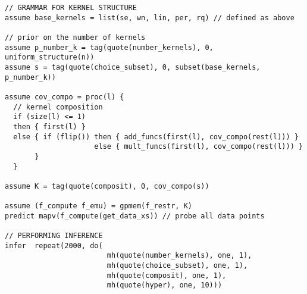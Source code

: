 \begin{minipage}{\linewidth}
\small
\belowcaptionskip=-10pt
\begin{lstlisting}[frame=single,mathescape,label=alg:structureVent,basicstyle=\selectfont\ttfamily,numbers=none]
// GRAMMAR FOR KERNEL STRUCTURE
assume base_kernels = list(se, wn, lin, per, rq) // defined as above

// prior on the number of kernels
assume p_number_k = tag(quote(number_kernels), 0, uniform_structure(n))
assume s = tag(quote(choice_subset), 0, subset(base_kernels, p_number_k))

assume cov_compo = proc(l) {
  // kernel composition
  if (size(l) <= 1)
  then { first(l) }
  else { if (flip()) then { add_funcs(first(l), cov_compo(rest(l))) }
                     else { mult_funcs(first(l), cov_compo(rest(l))) }
       }
  }
                          
assume K = tag(quote(composit), 0, cov_compo(s))

assume (f_compute f_emu) = gpmem(f_restr, K)
predict mapv(f_compute(get_data_xs)) // probe all data points

// PERFORMING INFERENCE  
infer  repeat(2000, do(
                        mh(quote(number_kernels), one, 1),
                        mh(quote(choice_subset), one, 1),
                        mh(quote(composit), one, 1),
                        mh(quote(hyper), one, 10)))
\end{lstlisting}

\end{minipage}
